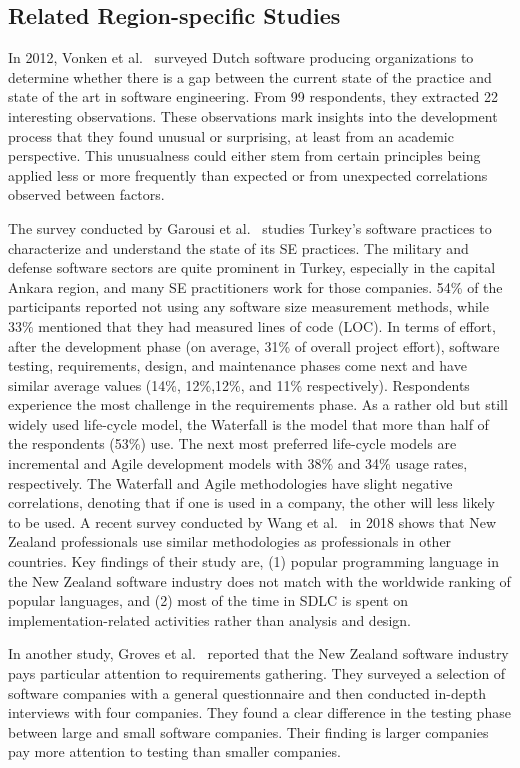 \subsection{Related Region-specific Studies}
\label{region specific study}

In 2012, Vonken et al.~\citep{Vonken2012} surveyed Dutch software producing organizations to determine whether there is a gap between the current state of the practice and state of the art in software engineering. From 99 respondents, they extracted 22 interesting observations. These observations mark insights into the development process that they found unusual or surprising, at least from an academic perspective. This unusualness could either stem from certain principles being applied less or more frequently than expected or from unexpected correlations observed between factors.

The survey conducted by Garousi et al.~\citep{Garousi2015} studies Turkey's software practices to characterize and understand the state of its SE practices. The military and defense software sectors are quite prominent in Turkey, especially in the capital Ankara region, and many SE practitioners work for those companies. 54\% of the participants reported not using any software size measurement methods, while 33\% mentioned that they had measured lines of code (LOC). In terms of effort, after the development phase (on average, 31\% of overall project effort), software testing, requirements, design, and maintenance phases come next and have similar average values (14\%, 12\%,12\%, and 11\% respectively). Respondents experience the most challenge in the requirements phase. As a rather old but still widely used life-cycle model, the Waterfall is the model that more than half of the respondents (53\%) use. The next most preferred life-cycle models are incremental and Agile development models with 38\% and 34\% usage rates, respectively. The Waterfall and Agile methodologies have slight negative correlations, denoting that if one is used in a company, the other will less likely to be used.
A recent survey conducted by Wang et al.~\citep{Wang2018} in 2018 shows that New Zealand professionals use similar methodologies as professionals in other countries. Key findings of their study are, (1) popular programming language in the New Zealand software industry does not match with the worldwide ranking of popular languages, and (2) most of the time in SDLC is spent on implementation-related activities rather than analysis and design.

In another study, Groves et al.~\citep{Groves2000} reported that the New Zealand software industry pays particular attention to requirements gathering. They surveyed a selection of software companies with a general questionnaire and then conducted in-depth interviews with four companies. They found a clear difference in the testing phase between large and small software companies. Their finding is larger companies pay more attention to testing than smaller companies.

